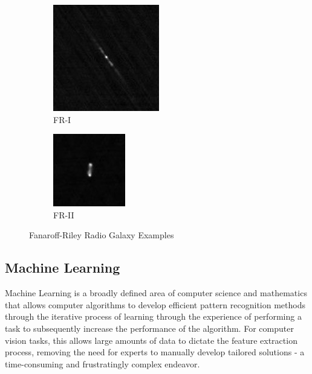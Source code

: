 \documentclass{article}
\begin{document}
\begin{figure}
    \centering
    \begin{subfigure}[b]{0.5\textwidth}
        \centering
        \includegraphics[width=0.5\linewidth]{../HOG/FR1.jpg} 
        \caption{FR-I}
        \label{fig:subim1}
    \end{subfigure}%
    \begin{subfigure}[b]{0.5\textwidth}
        \centering
        \includegraphics[width=0.5\linewidth]{../HOG/FR2.jpg}
        \caption{FR-II}
        \label{fig:subim2}
    \end{subfigure}
 
    \caption{Fanaroff-Riley Radio Galaxy Examples}
    \label{fig:image2}
\end{figure}


\subsection{\label{sec:level2}Machine Learning}


Machine Learning is a broadly defined area of computer science and mathematics that allows computer algorithms to develop efficient pattern recognition methods through the iterative process of learning through the experience of performing a task to subsequently increase the performance of the algorithm. For computer vision tasks, this allows large amounts of data to dictate the feature extraction process, removing the need for experts to manually develop tailored solutions - a time-consuming and frustratingly complex endeavor. 
\end{document}
